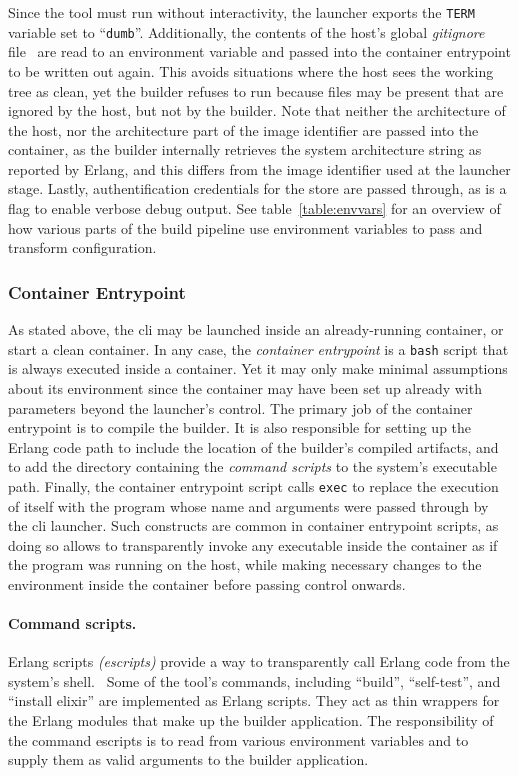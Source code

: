 Since the tool must run without interactivity, the launcher exports the \lstinline|TERM| variable set to ``\lstinline|dumb|''. Additionally, the contents of the host's global \emph{gitignore} file~\cite{man:git} are read to an environment variable and passed into the container entrypoint to be written out again. This avoids situations where the host sees the working tree as clean, yet the builder refuses to run because files may be present that are ignored by the host, but not by the builder. Note that neither the architecture of the host, nor the architecture part of the image identifier are passed into the container, as the builder internally retrieves the system architecture string as reported by Erlang, and this differs from the image identifier used at the launcher stage. Lastly, authentification credentials for the store are passed through, as is a flag to enable verbose debug output. See table~\ref{table:envvars} for an overview of how various parts of the build pipeline use environment variables to pass and transform configuration.

\cleardoublepage
\subsubsection{Container Entrypoint}

As stated above, the \acrshort{cli} may be launched inside an already-running container, or start a clean container. In any case, the \emph{container entrypoint} is a \lstinline|bash| script that is always executed inside a container. Yet it may only make minimal assumptions about its environment since the container may have been set up already with parameters beyond the launcher's control. The primary job of the container entrypoint is to compile the builder. It is also responsible for setting up the Erlang code path to include the location of the builder's compiled artifacts, and to add the directory containing the \emph{command scripts} to the system's executable path. Finally, the container entrypoint script calls \lstinline|exec| to replace the execution of itself with the program whose name and arguments were passed through by the \acrshort{cli} launcher. Such constructs are common in container entrypoint scripts, as doing so allows to transparently invoke any executable inside the container as if the program was running on the host, while making necessary changes to the environment inside the container before passing control onwards.

\paragraph{Command scripts.} Erlang scripts \emph{(escripts)} provide a way to transparently call Erlang code from the system's shell.~\cite{doc:otp} Some of the tool's commands, including ``build'', ``self-test'', and ``install elixir'' are implemented as Erlang scripts. They act as thin wrappers for the Erlang modules that make up the builder application. The responsibility of the command escripts is to read from various environment variables and to supply them as valid arguments to the builder application.

